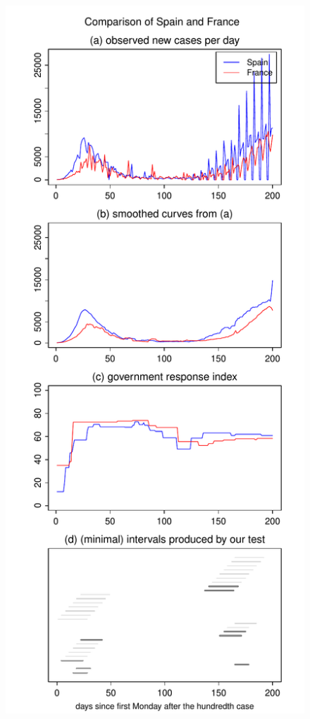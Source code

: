 \documentclass[a4paper,12pt]{article}
\numberwithin{equation}{section}
\begin{document}
{\begin{figure}[p!]
\begin{minipage}[t]{0.49\textwidth}
\includegraphics[width=\textwidth]{plots/ESP_vs_FRA_long}

\end{minipage}
\end{figure}}
\end{document}
